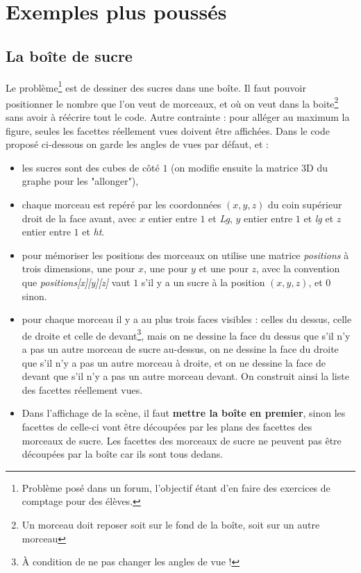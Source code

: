 \section{Exemples plus poussés}

\subsection{La boîte de sucre}

Le problème\footnote{Problème posé dans un forum, l'objectif étant d'en faire des exercices de comptage pour des élèves.} est de dessiner des sucres dans une boîte. Il faut pouvoir positionner le nombre que l'on veut de morceaux, et où on veut dans la boite\footnote{Un morceau doit reposer soit sur le fond de la boîte, soit sur un autre morceau} sans avoir à réécrire tout le code. Autre contrainte : pour alléger au maximum la figure, seules les facettes réellement vues doivent être affichées. Dans le code proposé ci-dessous on garde les angles de vues par défaut, et :
\begin{itemize}
    \item les sucres sont des cubes de côté $1$ (on modifie ensuite la matrice 3D du graphe pour les "allonger"),
    \item chaque morceau est repéré par les coordonnées $(x,y,z)$ du coin supérieur droit de la face avant, avec $x$ entier entre $1$ et \emph{Lg}, $y$ entier entre $1$ et \emph{lg} et $z$ entier entre $1$ et \emph{ht}.
    \item pour mémoriser les positions des morceaux on utilise une matrice \emph{positions} à trois dimensions, une pour $x$, une pour $y$ et une pour $z$, avec la convention que \emph{positions[x][y][z]} vaut $1$ s'il y a un sucre à la position $(x,y,z)$, et $0$ sinon.
    \item pour chaque morceau il y a au plus trois faces visibles : celles du dessus, celle de droite et celle de devant\footnote{À condition de ne pas changer les angles de vue !}, mais on ne dessine la face du dessus que s'il n'y a pas un autre morceau de sucre au-dessus, on ne dessine la face du droite que s'il n'y a pas un autre morceau à droite, et on ne dessine la face de devant que s'il n'y a pas un autre morceau devant. On construit ainsi la liste des facettes réellement vues.
    \item Dans l'affichage de la scène, il faut \textbf{mettre la boîte en premier}, sinon les facettes de celle-ci vont être découpées par les plans des facettes des morceaux de sucre. Les facettes des morceaux de sucre ne peuvent pas être découpées par la boîte car ils sont tous dedans.
\end{itemize}

